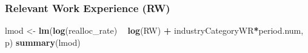 \documentclass[
]{article}
\newenvironment{Shaded}{\begin{snugshade}}{\end{snugshade}}
\newcommand{\KeywordTok}[1]{\textcolor[rgb]{0.13,0.29,0.53}{\textbf{#1}}}
\newcommand{\NormalTok}[1]{#1}
\newcommand{\OperatorTok}[1]{\textcolor[rgb]{0.81,0.36,0.00}{\textbf{#1}}}
\newcommand{\StringTok}[1]{\textcolor[rgb]{0.31,0.60,0.02}{#1}}
\begin{document}
\hypertarget{relevant-work-experience-rw-1}{%
\subsubsection{Relevant Work Experience
(RW)}\label{relevant-work-experience-rw-1}}

\begin{Shaded}
\begin{Highlighting}[]
\NormalTok{lmod <-}\StringTok{ }\KeywordTok{lm}\NormalTok{(}\KeywordTok{log}\NormalTok{(realloc_rate) }\OperatorTok{~}\StringTok{ }\KeywordTok{log}\NormalTok{(RW) }\OperatorTok{+}\StringTok{ }\NormalTok{industryCategoryWR}\OperatorTok{*}\NormalTok{period.num, p)}
\KeywordTok{summary}\NormalTok{(lmod)}
\end{Highlighting}
\end{Shaded}
\end{document}
